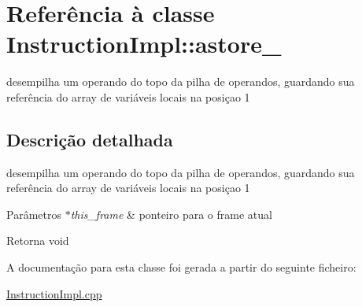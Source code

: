 \hypertarget{class_instruction_impl_1_1astore__1}{}\section{Referência à classe Instruction\+Impl\+:\+:astore\+\_}
\label{class_instruction_impl_1_1astore__1}


desempilha um operando do topo da pilha de operandos, guardando sua referência do array de variáveis locais na posiçao 1  




\subsection{Descrição detalhada}
desempilha um operando do topo da pilha de operandos, guardando sua referência do array de variáveis locais na posiçao 1 


\begin{DoxyParams}{Parâmetros}
{\em $\ast$this\+\_\+frame} & ponteiro para o frame atual \\
\hline
\end{DoxyParams}
\begin{DoxyReturn}{Retorna}
void 
\end{DoxyReturn}


A documentação para esta classe foi gerada a partir do seguinte ficheiro\+:\begin{DoxyCompactItemize}
\item 
\hyperlink{_instruction_impl_8cpp}{Instruction\+Impl.\+cpp}\end{DoxyCompactItemize}
